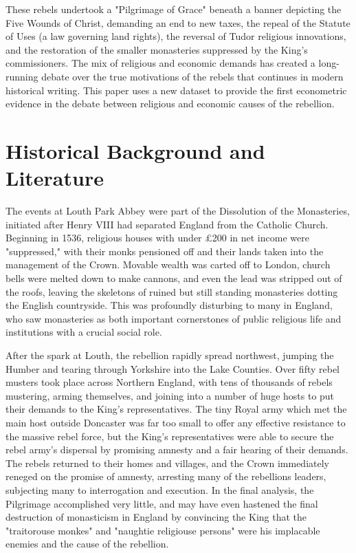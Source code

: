\documentclass[12pt]{article}
\begin{document}
These rebels undertook a "Pilgrimage of Grace" beneath a banner depicting the Five Wounds of Christ, demanding an end to new taxes, the repeal of the Statute of Uses (a law governing land rights), the reversal of Tudor religious innovations, and the restoration of the smaller monasteries suppressed by the King's commissioners.\autocite[154]{Hoyle2001} The mix of religious and economic demands has created a long-running debate over the true motivations of the rebels that continues in modern historical writing. This paper uses a new dataset to provide the first econometric evidence in the debate between religious and economic causes of the rebellion.

\section{Historical Background and Literature}
The events at Louth Park Abbey were part of the Dissolution of the Monasteries, initiated after Henry VIII had separated England from the Catholic Church. Beginning in 1536, religious houses with under \pounds200 in net income were "suppressed," with their monks pensioned off and their lands taken into the management of the Crown. Movable wealth was carted off to London, church bells were melted down to make cannons, and even the lead was stripped out of the roofs, leaving the skeletons of ruined but still standing monasteries dotting the English countryside.\autocite[126]{Woodward1969} This was profoundly disturbing to many in England, who saw monasteries as both important cornerstones of public religious life and institutions with a crucial social role.

After the spark at Louth, the rebellion rapidly spread northwest, jumping the Humber and tearing through Yorkshire into the Lake Counties.\autocite[176]{Hoyle2001} Over fifty rebel musters took place across Northern England, with tens of thousands of rebels mustering, arming themselves, and joining into a number of huge hosts to put their demands to the King's representatives.\autocite[376]{Bush1996} The tiny Royal army which met the main host outside Doncaster was far too small to offer any effective resistance to the massive rebel force, but the King's representatives were able to secure the rebel army's dispersal by promising amnesty and a fair hearing of their demands.\autocite[386]{Bush1996} The rebels returned to their homes and villages, and the Crown immediately reneged on the promise of amnesty, arresting many of the rebellions leaders, subjecting many to interrogation and execution.\autocite[38]{Fletcher2008} In the final analysis, the Pilgrimage accomplished very little, and may have even hastened the final destruction of monasticism in England by convincing the King that the "traitorouse monkes" and "naughtie religiouse persons"\autocite[285-6]{Clark2021} were his implacable enemies and the cause of the rebellion.\autocite[402]{Bernard2011}
\end{document}
